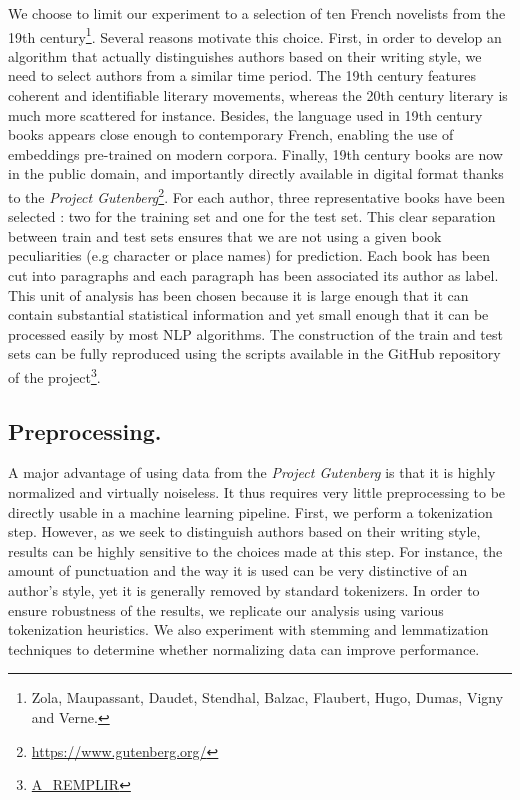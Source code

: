 \documentclass[11pt,a4paper]{article}
\begin{document}
We choose to limit our experiment to a selection of ten French novelists from the 19th century\footnote{Zola, Maupassant, Daudet, Stendhal, Balzac, Flaubert, Hugo, Dumas, Vigny and Verne.}. Several reasons motivate this choice. First, in order to develop an algorithm that actually distinguishes authors based on their writing style, we need to select authors from a similar time period. The 19th century features coherent and identifiable literary movements, whereas the 20th century literary is much more scattered for instance. Besides, the language used in 19th century books appears close enough to contemporary French, enabling the use of embeddings pre-trained on modern corpora. Finally, 19th century books are now in the public domain, and importantly directly available in digital format thanks to the \textit{Project Gutenberg}\footnote{\url{https://www.gutenberg.org/}}. For each author, three representative books have been selected : two for the training set and one for the test set. This clear separation between train and test sets ensures that we are not using a given book peculiarities (e.g character or place names) for prediction. Each book has been cut into paragraphs and each paragraph has been associated its author as label. This unit of analysis has been chosen because it is large enough that it can contain substantial statistical information and yet small enough that it can be processed easily by most NLP algorithms. The construction of the train and test sets can be fully reproduced using the scripts available in the GitHub repository of the project\footnote{\url{A_REMPLIR}}.

\subsection{Preprocessing.} 

A major advantage of using data from the \textit{Project Gutenberg} is that it is highly normalized and virtually noiseless. It thus requires very little preprocessing to be directly usable in a machine learning pipeline. First, we perform a tokenization step. However, as we seek to distinguish authors based on their writing style, results can be highly sensitive to the choices made at this step. For instance, the amount of punctuation and the way it is used can be very distinctive of an author's style, yet it is generally removed by standard tokenizers. In order to ensure robustness of the results, we replicate our analysis using various tokenization heuristics. We also experiment with stemming and lemmatization techniques to determine whether normalizing data can improve performance.
\end{document}
